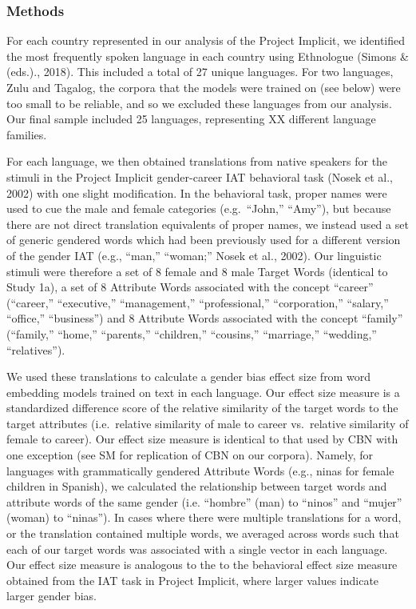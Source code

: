 \documentclass[man,floatsintext]{apa6}
\theoremstyle{definition}
\theoremstyle{definition}
\theoremstyle{definition}
\theoremstyle{remark}
\begin{document}
\subsubsection{Methods}\label{methods-1}

For each country represented in our analysis of the Project Implicit, we
identified the most frequently spoken language in each country using
Ethnologue (Simons \& (eds.)., 2018). This included a total of 27 unique
languages. For two languages, Zulu and Tagalog, the corpora that the
models were trained on (see below) were too small to be reliable, and so
we excluded these languages from our analysis. Our final sample included
25 languages, representing XX different language families.

For each language, we then obtained translations from native speakers
for the stimuli in the Project Implicit gender-career IAT behavioral
task (Nosek et al., 2002) with one slight modification. In the
behavioral task, proper names were used to cue the male and female
categories (e.g.~\enquote{John,} \enquote{Amy}), but because there are
not direct translation equivalents of proper names, we instead used a
set of generic gendered words which had been previously used for a
different version of the gender IAT (e.g., ``man,'' ``woman;'' Nosek et
al., 2002). Our linguistic stimuli were therefore a set of 8 female and
8 male Target Words (identical to Study 1a), a set of 8 Attribute Words
associated with the concept \enquote{career} (\enquote{career,}
\enquote{executive,} \enquote{management,} \enquote{professional,}
\enquote{corporation,} \enquote{salary,} \enquote{office,}
\enquote{business}) and 8 Attribute Words associated with the concept
\enquote{family} (\enquote{family,} \enquote{home,} \enquote{parents,}
\enquote{children,} \enquote{cousins,} \enquote{marriage,}
\enquote{wedding,} \enquote{relatives}).

We used these translations to calculate a gender bias effect size from
word embedding models trained on text in each language. Our effect size
measure is a standardized difference score of the relative similarity of
the target words to the target attributes (i.e.~relative similarity of
male to career vs.~relative similarity of female to career). Our effect
size measure is identical to that used by CBN with one exception (see SM
for replication of CBN on our corpora). Namely, for languages with
grammatically gendered Attribute Words (e.g., ninas for female children
in Spanish), we calculated the relationship between target words and
attribute words of the same gender (i.e. \enquote{hombre} (man) to
\enquote{ninos} and \enquote{mujer} (woman) to \enquote{ninas}). In
cases where there were multiple translations for a word, or the
translation contained multiple words, we averaged across words such that
each of our target words was associated with a single vector in each
language. Our effect size measure is analogous to the to the behavioral
effect size measure obtained from the IAT task in Project Implicit,
where larger values indicate larger gender bias.
\end{document}
